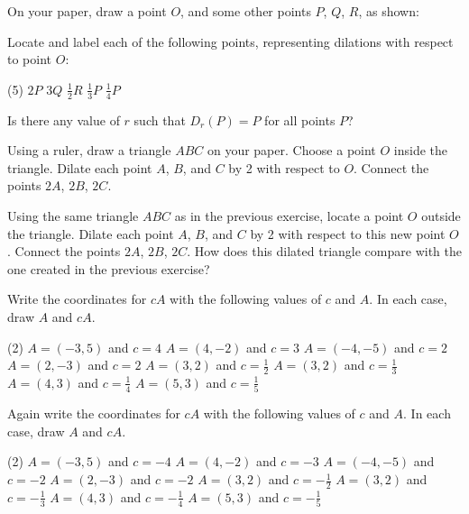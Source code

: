 \documentclass[12pt]{book} %
\begin{document}
\setcounter{Exercise}{0}
\begin{ExerciseList}
\Exercise On your paper, draw a point $O$, and some other points $P$, $Q$, $R$, as shown:

\begin{center}
\end{center}

Locate and label each of the following points, representing dilations with respect to point $O$:
\begin{tasks}(5)
\task[(a)] $2P$
\task[(b)] $3Q$
\task[(c)] $\frac12R$
\task[(d)] $\frac13P$
\task[(e)] $\frac14P$
\end{tasks}

\Exercise Is there any value of $r$ such that $D_r(P)=P$ for all points $P$?

\Exercise Using a ruler, draw a triangle $ABC$ on your paper. Choose a point $O$ inside the triangle. Dilate each point $A$, $B$, and $C$ by 2 with respect to $O$. Connect the points $2A$, $2B$, $2C$.

\Exercise Using the same triangle $ABC$ as in the previous exercise, locate a point $O$ outside the triangle. Dilate each point $A$, $B$, and $C$ by 2 with respect to this new point $O$. Connect the points $2A$, $2B$, $2C$. How does this dilated triangle compare with the one created in the previous exercise?

\Exercise Write the coordinates for $cA$ with the following values of $c$ and $A$. In each case, draw $A$ and $cA$.
\begin{tasks}(2)
\task[(a)] $A=(-3,5)$ and $c=4$
\task[(b)] $A=(4,-2)$ and $c=3$
\task[(c)] $A=(-4,-5)$ and $c=2$
\task[(d)] $A=(2,-3)$ and $c=2$
\task[(e)] $A=(3,2)$ and $c=\frac12$
\task[(f)] $A=(3,2)$ and $c=\frac13$
\task[(g)] $A=(4,3)$ and $c=\frac14$
\task[(h)] $A=(5,3)$ and $c=\frac15$
\end{tasks}

\Exercise Again write the coordinates for $cA$ with the following values of $c$ and $A$. In each case, draw $A$ and $cA$.
\begin{tasks}(2)
\task[(a)] $A=(-3,5)$ and $c=-4$
\task[(b)] $A=(4,-2)$ and $c=-3$
\task[(c)] $A=(-4,-5)$ and $c=-2$
\task[(d)] $A=(2,-3)$ and $c=-2$
\task[(e)] $A=(3,2)$ and $c=-\frac12$
\task[(f)] $A=(3,2)$ and $c=-\frac13$
\task[(g)] $A=(4,3)$ and $c=-\frac14$
\task[(h)] $A=(5,3)$ and $c=-\frac15$
\end{tasks}


\end{ExerciseList}
\end{document}
